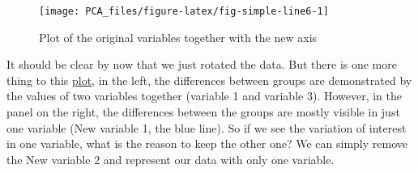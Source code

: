 \documentclass[
]{book}
\newenvironment{Shaded}{\begin{snugshade}}{\end{snugshade}}
\newcommand{\CommentTok}[1]{\textcolor[rgb]{0.56,0.35,0.01}{\textit{#1}}}
\newcommand{\DataTypeTok}[1]{\textcolor[rgb]{0.13,0.29,0.53}{#1}}
\newcommand{\DecValTok}[1]{\textcolor[rgb]{0.00,0.00,0.81}{#1}}
\newcommand{\FloatTok}[1]{\textcolor[rgb]{0.00,0.00,0.81}{#1}}
\newcommand{\KeywordTok}[1]{\textcolor[rgb]{0.13,0.29,0.53}{\textbf{#1}}}
\newcommand{\NormalTok}[1]{#1}
\newcommand{\OperatorTok}[1]{\textcolor[rgb]{0.81,0.36,0.00}{\textbf{#1}}}
\newcommand{\StringTok}[1]{\textcolor[rgb]{0.31,0.60,0.02}{#1}}
\theoremstyle{definition}
\theoremstyle{definition}
\theoremstyle{definition}
\theoremstyle{remark}
\begin{document}
\begin{figure}

{\centering \texttt{[image: PCA\_files/figure-latex/fig-simple-line6-1]} 

}

\caption{Plot of the original variables together with the new axis}\label{fig:fig-simple-line6}
\end{figure}

It should be clear by now that we just rotated the data. But there is one more thing to this \protect\hyperlink{fig-simple-line6}{plot}, in the left, the differences between groups are demonstrated by the values of two variables together (variable 1 and variable 3). However, in the panel on the right, the differences between the groups are mostly visible in just one variable (New variable 1, the blue line). So if we see the variation of interest in one variable, what is the reason to keep the other one? We can simply remove the New variable 2 and represent our data with only one variable.

\begin{Shaded}
\end{Shaded}
\end{document}
